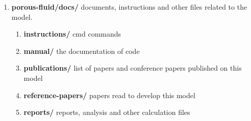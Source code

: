 \documentclass[
	12pt
] {article}
\begin{document}
	\begin{enumerate}
		\item \textbf{porous-fluid/docs/} documents, instructions and other files related to the model.
			\begin{enumerate}
				\item \textbf{instructions/} cmd commands
				\item \textbf{manual/} the documentation of code
				\item \textbf{publications/} list of papers and conference papers published on this model
				\item \textbf{reference-papers/} papers read to develop this model
				\item \textbf{reports/} reports, analysis and other calculation files
			\end{enumerate}
		

\end{enumerate}
\end{document}
